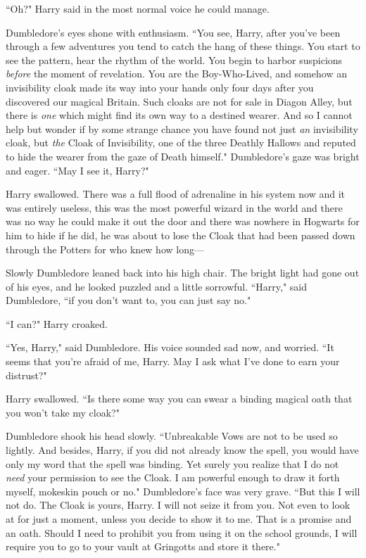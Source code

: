 ``Oh?" Harry said in the most normal voice he could manage.

Dumbledore's eyes shone with enthusiasm. ``You see, Harry, after you've been through a few adventures you tend to catch the hang of these things. You start to see the pattern, hear the rhythm of the world. You begin to harbor suspicions \emph{before} the moment of revelation. You are the Boy-Who-Lived, and somehow an invisibility cloak made its way into your hands only four days after you discovered our magical Britain. Such cloaks are not for sale in Diagon Alley, but there is \emph{one} which might find its own way to a destined wearer. And so I cannot help but wonder if by some strange chance you have found not just \emph{an} invisibility cloak, but \emph{the} Cloak of Invisibility, one of the three Deathly Hallows and reputed to hide the wearer from the gaze of Death himself." Dumbledore's gaze was bright and eager. ``May I see it, Harry?"

Harry swallowed. There was a full flood of adrenaline in his system now and it was entirely useless, this was the most powerful wizard in the world and there was no way he could make it out the door and there was nowhere in Hogwarts for him to hide if he did, he was about to lose the Cloak that had been passed down through the Potters for who knew how long—

Slowly Dumbledore leaned back into his high chair. The bright light had gone out of his eyes, and he looked puzzled and a little sorrowful. ``Harry," said Dumbledore, ``if you don't want to, you can just say no."

``I can?" Harry croaked.

``Yes, Harry," said Dumbledore. His voice sounded sad now, and worried. ``It seems that you're afraid of me, Harry. May I ask what I've done to earn your distrust?"

Harry swallowed. ``Is there some way you can swear a binding magical oath that you won't take my cloak?"

Dumbledore shook his head slowly. ``Unbreakable Vows are not to be used so lightly. And besides, Harry, if you did not already know the spell, you would have only my word that the spell was binding. Yet surely you realize that I do not \emph{need} your permission to see the Cloak. I am powerful enough to draw it forth myself, mokeskin pouch or no." Dumbledore's face was very grave. ``But this I will not do. The Cloak is yours, Harry. I will not seize it from you. Not even to look at for just a moment, unless you decide to show it to me. That is a promise and an oath. Should I need to prohibit you from using it on the school grounds, I will require you to go to your vault at Gringotts and store it there."

